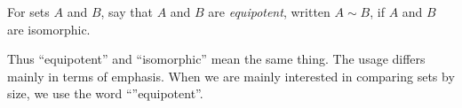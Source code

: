 \begin{defn}
	For sets $A$ and $B$, say that $A$ and $B$ are \emph{equipotent}, written $A\sim B$, if $A$ and $B$ are isomorphic.
\end{defn}

Thus ``equipotent'' and ``isomorphic'' mean the same thing. The usage differs mainly in terms of emphasis. When we are mainly interested in comparing sets by size, we use the word ``''equipotent''. 


%


